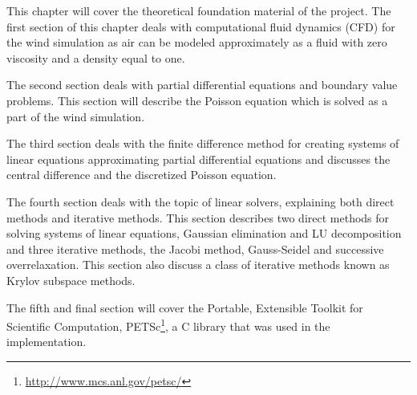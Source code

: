 This chapter will cover the theoretical foundation material of the project. 
The first section of this chapter deals with computational fluid dynamics (CFD) 
for the wind simulation as air can be modeled approximately as a fluid with 
zero viscosity and a density equal to one\cite{originalSnowThesis}.

The second section deals with partial differential equations and boundary value
problems. This section will describe the Poisson equation which is solved as a 
part of the wind simulation.

The third section deals with the finite difference method for creating systems of
linear equations approximating partial differential equations and discusses
the central difference and the discretized Poisson equation.

The fourth section deals with the topic of linear solvers, explaining both direct
methods and iterative methods. This section describes two direct
methods for solving systems of linear equations, Gaussian elimination and LU
decomposition and three iterative methods, the Jacobi method, Gauss-Seidel and
successive overrelaxation. This section also discuss a class of iterative methods 
known as Krylov subspace methods. 

The fifth and final section will cover the Portable, Extensible Toolkit for
Scientific Computation, PETSc\footnote{\url{http://www.mcs.anl.gov/petsc/}}, a C 
library that was used in the implementation.
